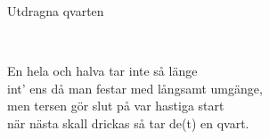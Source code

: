 \begin{song}{Utdragna qvarten}

	
	\\

	En hela och halva tar inte så länge\\
	int' ens då man festar med långsamt umgänge,\\
	men tersen gör slut på var hastiga start\\
	när nästa skall drickas så tar de(t) en qvart.
	
\end{song}
